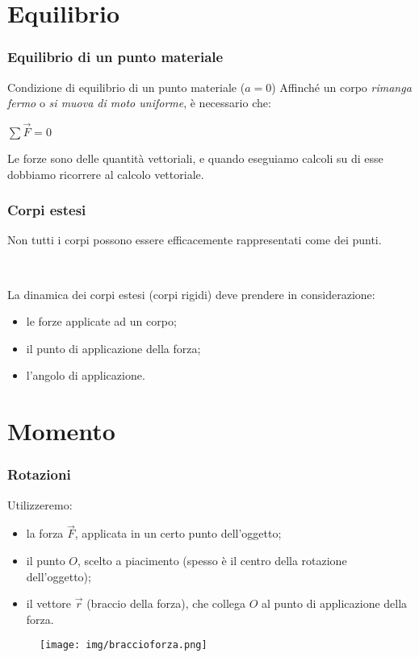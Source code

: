 \documentclass[]{beamer}
\theoremstyle{plain}
\begin{document}
\section{Equilibrio}



\begin{frame}
  \frametitle{Equilibrio di un punto materiale}
\begin{block}{Condizione di equilibrio di un punto materiale ($ a=0 $)}
Affinché un corpo \emph{rimanga fermo} o \emph{si muova di moto uniforme}, è necessario che:
\begin{center}
\colorbox{marroncino!30}{$ \sum \vec{F} = 0 $}
\end{center}\pause
\end{block}
Le forze sono delle \alert{quantità vettoriali}, e quando eseguiamo calcoli su di esse dobbiamo ricorrere al calcolo vettoriale.
\end{frame}





\begin{frame}
\frametitle{Corpi estesi}
Non tutti i corpi possono essere efficacemente rappresentati come dei punti.\pause

~

La \alert{dinamica dei corpi estesi} (corpi rigidi) deve prendere in considerazione:
\begin{itemize}
  \item le forze applicate ad un corpo;
  \item il punto di applicazione della forza;
  \item l'angolo di applicazione.
\end{itemize}
\end{frame}



\section{Momento}

\begin{frame}
\frametitle{Rotazioni}
Utilizzeremo:
\begin{itemize}
  \item la \alert<1>{forza $ \vec{F} $}, applicata in un certo punto dell'oggetto;\pause
  \item il \alert<2>{punto $ O $}, scelto a piacimento (spesso è il centro della rotazione dell'oggetto);\pause
  \item il \alert<3>{vettore $ \vec{r} $} (braccio della forza), che collega $ O $ al punto di applicazione della forza.
\end{itemize}
\begin{figure}
\texttt{[image: img/braccioforza.png]}
\end{figure}
\end{frame}
\end{document}
